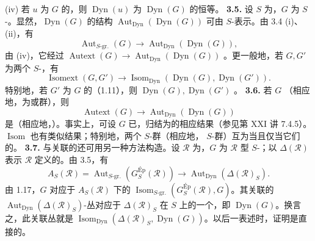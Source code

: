 (iv) 若 $u$ 为 $G$ 的，则 $\operatorname{Dyn}(u)$ 为 $\operatorname{Dyn}(G)$ 的恒等。
\textbf{3.5.} 设 $S$ 为，$G$ 为 $S$-。显然，$\operatorname{Dyn}(G)$ 的结构 $\operatorname{Aut}_{\mathrm{Dyn}}(\operatorname{Dyn}(G))$ 可由 $S$-表示。由 3.4 (i)、(ii)，有
\[\operatorname{Aut}_{S\text{-gr.}}(G)\longrightarrow\operatorname{Aut}_{\mathrm{Dyn}}(\operatorname{Dyn}(G)),\]
由 (iv)，它经过 $\operatorname{Autext}(G)\to\operatorname{Aut}_{\mathrm{Dyn}}(\operatorname{Dyn}(G))$ 。更一般地，若 $G,G'$ 为两个 $S$-，有
\[\operatorname{Isomext}(G,G')\longrightarrow\operatorname{Isom}_{\mathrm{Dyn}}(\operatorname{Dyn}(G),\operatorname{Dyn}(G')).\]
特别地，若 $G'$ 为 $G$ 的（1.11），则 $\operatorname{Dyn}(G),\operatorname{Dyn}(G')$ 。
\textbf{3.6.} 若 $G$ （相应地，为或群），则
\[\operatorname{Autext}(G)\longrightarrow\operatorname{Aut}_{\mathrm{Dyn}}(\operatorname{Dyn}(G))\]
是（相应地，）。事实上，可设 $G$ 已，归结为的相应结果（参见第 XXI 讲 7.4.5）。
$\operatorname{Isom}$ 也有类似结果；特别地，两个 $S$-群（相应地， $S$-群）互为当且仅当它们的。
\textbf{3.7.} 与关联的还可用另一种方法构造。设 $\mathcal R$ 为，$G$ 为 $\mathcal R$ 型 $S$-；以 $\Delta(\mathcal R)$ 表示 $\mathcal R$ 定义的。由 3.5，有
\[A_S(\mathcal R)=\operatorname{Aut}_{S\text{-gr.}}(G^{\mathrm{Ép}}_S(\mathcal R))\longrightarrow\operatorname{Aut}_{\mathrm{Dyn}}(\Delta(\mathcal R)_S).\]
由 1.17，$G$ 对应于 $A_S(\mathcal R)$ 下的 $\operatorname{Isom}_{S\text{-gr.}}(G^{\mathrm{Ép}}_S(\mathcal R),G)$。其关联的 $\operatorname{Aut}_{\mathrm{Dyn}}(\Delta(\mathcal R)_S)$-丛对应于 $\Delta(\mathcal R)_S$ 在 $S$ 上的一个，即 $\operatorname{Dyn}(G)$。换言之，此关联丛就是 $\operatorname{Isom}_{\mathrm{Dyn}}(\Delta(\mathcal R)_S,\operatorname{Dyn}(G))$。以后一表述时，证明是直接的。

